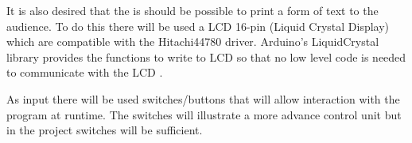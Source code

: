 It is also desired that the is should be possible to print a form of text to the audience. To do this there will be used a LCD 16-pin (Liquid Crystal Display) which are compatible with the Hitachi44780 driver. Arduino's LiquidCrystal library provides the functions to write to LCD so that no low level code is needed to communicate with the LCD \citep{ArduinoLCD}.

As input there will be used switches/buttons that will allow interaction with the program at runtime. The switches will illustrate a more advance control unit but in the project switches will be sufficient.